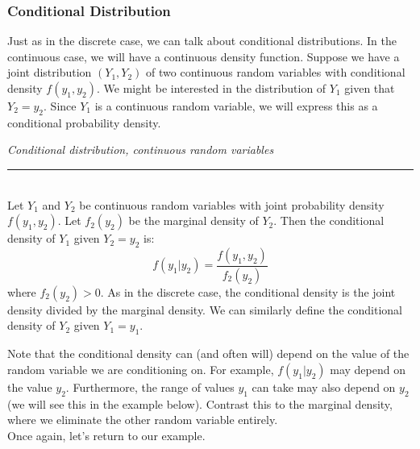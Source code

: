 \documentclass[12pt]{article}
\theoremstyle{definition}
\theoremstyle{remark}
\begin{document}
\subsubsection{Conditional Distribution}
Just as in the discrete case, we can talk about conditional distributions. In the continuous case, we will have a continuous density function. Suppose we have a joint distribution $(Y_1, Y_2)$ of two continuous random variables with conditional density $f(y_1, y_2)$. We might be interested in the distribution of $Y_1$ given that $Y_2 = y_2$. Since $Y_1$ is a continuous random variable, we will express this as a conditional probability density.\\

\begin{framed}
\emph{Conditional distribution, continuous random variables}\\
  \rule{\dimexpr{}\fboxrule}{.1pt} \\
Let $Y_1$ and $Y_2$ be continuous random variables with joint probability density $f(y_1, y_2)$. Let $f_2(y_2)$ be the marginal density of $Y_2$. Then the conditional density of $Y_1$ given $Y_2 = y_2$ is:
\[
f(y_1|y_2) = \frac{f(y_1, y_2)}{f_2(y_2)}
\]
where $f_2(y_2) > 0$. As in the discrete case, the conditional density is the joint density divided by the marginal density. We can similarly define the conditional density of $Y_2$ given $Y_1 = y_1$.
\end{framed}
Note that the conditional density can (and often will) depend on the value of the random variable we are conditioning on. For example, $f(y_1|y_2)$ may depend on the value $y_2$. Furthermore, the range of values $y_1$ can take may also depend on $y_2$ (we will see this in the example below). Contrast this to the marginal density, where we eliminate the other random variable entirely.\\

Once again, let's return to our example.
\end{document}
